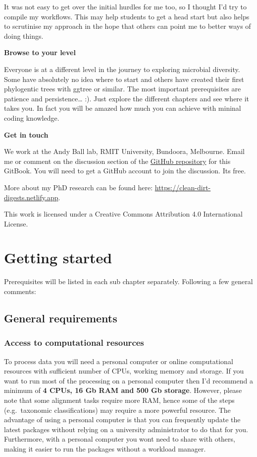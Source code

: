 \documentclass[
]{book}
\begin{document}
It was not easy to get over the initial hurdles for me too, so I thought I'd try to compile my workflows. This may help students to get a head start but also helps to scrutinise my approach in the hope that others can point me to better ways of doing things.

\textbf{Browse to your level}

Everyone is at a different level in the journey to exploring microbial diversity. Some have absolutely no idea where to start and others have created their first phylogentic trees with ggtree or similar. The most important prerequisites are patience and persistence\ldots{} :). Just explore the different chapters and see where it takes you. In fact you will be amazed how much you can achieve with mininal coding knowledge.

\textbf{Get in touch}

We work at the Andy Ball lab, RMIT University, Bundoora, Melbourne. Email me or comment on the discussion section of the \href{https://github.com/chrismitbiz/ABlab-workflows/discussions/}{GitHub repository} for this GitBook. You will need to get a GitHub account to join the discussion. Its free.

More about my PhD research can be found here: \url{https://clean-dirt-digests.netlify.app}.

This work is licensed under a Creative Commons Attribution 4.0 International License.

\hypertarget{gettingstarted}{%
\chapter{Getting started}\label{gettingstarted}}

Prerequisites will be listed in each sub chapter separately.
Following a few general comments:

\hypertarget{general-requirements}{%
\section{General requirements}\label{general-requirements}}

\hypertarget{access-to-computational-resources}{%
\subsection{Access to computational resources}\label{access-to-computational-resources}}

To process data you will need a personal computer or online computational resources with sufficient number of CPUs, working memory and storage. If you want to run most of the processing on a personal computer then I'd recommend a minimum of \textbf{4 CPUs, 16 Gb RAM and 500 Gb storage}. However, please note that some alignment tasks require more RAM, hence some of the steps (e.g.~taxonomic classifications) may require a more powerful resource. The advantage of using a personal computer is that you can frequently update the latest packages without relying on a university administrator to do that for you. Furthermore, with a personal computer you wont need to share with others, making it easier to run the packages without a workload manager.
\end{document}
